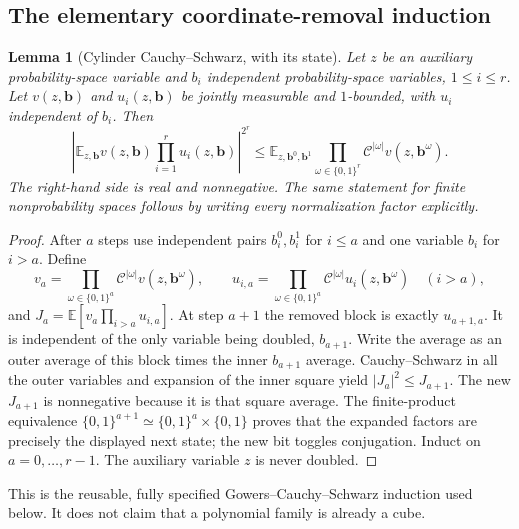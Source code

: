 \documentclass[11pt]{article}
\newtheorem{lemma}[lemma]{Lemma}
\theoremstyle{definition}
\begin{document}
\subsection{The elementary coordinate-removal induction}
\begin{lemma}[Cylinder Cauchy--Schwarz, with its state]\label{patch:cylinder}
Let $z$ be an auxiliary probability-space variable and $b_i$ independent probability-space
variables, $1\leq i\leq r$.  Let $v(z,\mathbf b)$ and $u_i(z,\mathbf b)$ be jointly measurable and $1$-bounded,
with $u_i$ independent of $b_i$.  Then
\[
 \left|\mathbb E_{z,\mathbf b}v(z,\mathbf b)\prod_{i=1}^r u_i(z,\mathbf b)\right|^{2^r}
 \leq\mathbb E_{z,\mathbf b^0,\mathbf b^1}
       \prod_{\omega\in\{0,1\}^r}\mathcal C^{|\omega|}v(z,\mathbf b^\omega).
\]
The right-hand side is real and nonnegative.  The same statement for finite nonprobability
spaces follows by writing every normalization factor explicitly.
\end{lemma}
\begin{proof}
After $a$ steps use independent pairs $b_i^0,b_i^1$ for $i\leq a$ and one variable $b_i$
for $i>a$.  Define
\[
 v_a=\prod_{\omega\in\{0,1\}^a}\mathcal C^{|\omega|}v(z,\mathbf b^\omega),
 \qquad
 u_{i,a}=\prod_{\omega\in\{0,1\}^a}\mathcal C^{|\omega|}u_i(z,\mathbf b^\omega)
 \quad(i>a),
\]
and $J_a=\mathbb E[v_a\prod_{i>a}u_{i,a}]$.
At step $a+1$ the removed block is exactly $u_{a+1,a}$.
It is independent of the only variable being doubled, $b_{a+1}$.
Write the average as an outer average of this block times the inner $b_{a+1}$ average.
Cauchy--Schwarz in all the outer variables and expansion of the inner square yield
$|J_a|^2\leq J_{a+1}$.  The new $J_{a+1}$ is nonnegative because it is that square average.
The finite-product equivalence $\{0,1\}^{a+1}\simeq\{0,1\}^a\times\{0,1\}$ proves
that the expanded factors are precisely the displayed next state; the new bit toggles
conjugation.  Induct on $a=0,\ldots,r-1$.  The auxiliary variable $z$ is never doubled.
\end{proof}
This is the reusable, fully specified Gowers--Cauchy--Schwarz induction used below.
It does not claim that a polynomial family is already a cube.
\end{document}
